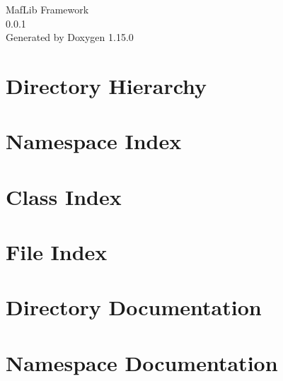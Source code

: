 \documentclass[twoside]{book}
\newcommand{\+}{\discretionary{\mbox{\scriptsize$\hookleftarrow$}}{}{}}
\newcommand{\clearemptydoublepage}{%
    \newpage{\pagestyle{empty}\cleardoublepage}%
  }
\begin{document}
  \raggedbottom
    \hypersetup{pageanchor=false,
                bookmarksnumbered=true,
                pdfencoding=unicode
               }
  \begin{titlepage}
  \vspace*{7cm}
  \begin{center}%
  {\Large Maf\+Lib Framework}\\
  [1ex]\large 0.\+0.\+1 \\
  \vspace*{1cm}
  {\large Generated by Doxygen 1.15.0}\\
  \end{center}
  \end{titlepage}
  \clearemptydoublepage
  \tableofcontents
  \clearemptydoublepage
  \hypersetup{pageanchor=true}
\chapter{Directory Hierarchy}

\chapter{Namespace Index}

\chapter{Class Index}

\chapter{File Index}

\chapter{Directory Documentation}











\chapter{Namespace Documentation}



\end{document}
